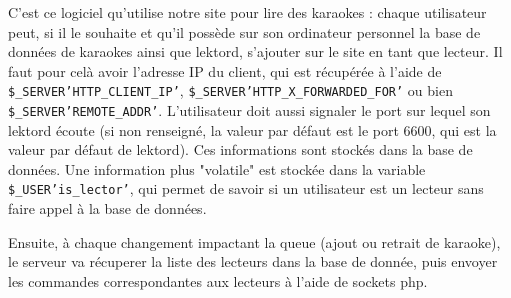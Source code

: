 C'est ce logiciel qu'utilise notre site pour lire des karaokes : chaque utilisateur peut, si il le souhaite et qu'il possède sur son ordinateur personnel la base de données de karaokes ainsi que lektord, s'ajouter sur le site en tant que lecteur. Il faut pour celà avoir l'adresse IP du client, qui est récupérée à l'aide de \texttt{\$\_SERVER\lbrack'HTTP\_CLIENT\_IP'\rbrack}, \texttt{\$\_SERVER\lbrack'HTTP\_X\_FORWARDED\_FOR'\rbrack} ou bien \texttt{\$\_SERVER\lbrack'REMOTE\_ADDR'\rbrack}.
L'utilisateur doit aussi signaler le port sur lequel son lektord écoute (si non renseigné, la valeur par défaut est le port 6600, qui est la valeur par défaut de lektord).
Ces informations sont stockés dans la base de données.
Une information plus "volatile" est stockée dans la variable \texttt{\$\_USER\lbrack'is\_lector'\rbrack}, qui permet de savoir si un utilisateur est un lecteur sans faire appel à la base de données.

Ensuite, à chaque changement impactant la queue (ajout ou retrait de karaoke), le serveur va récuperer la liste des lecteurs dans la base de donnée, puis envoyer les commandes correspondantes aux lecteurs à l'aide de sockets php.
